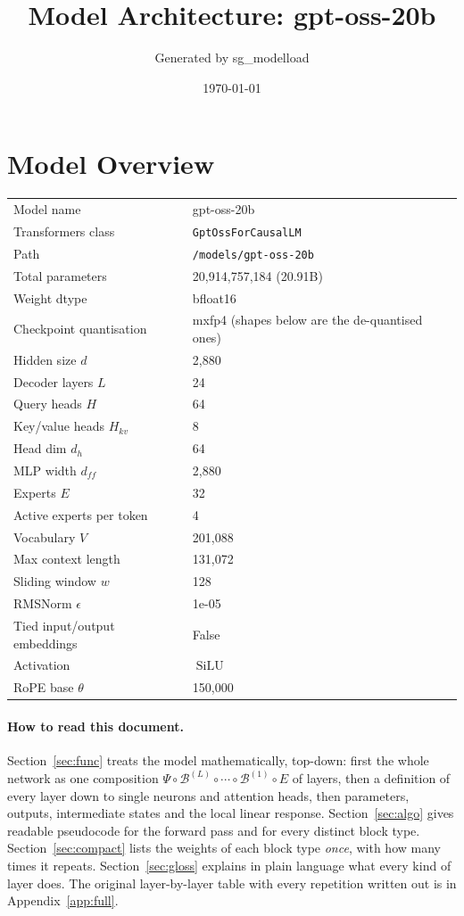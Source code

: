 \documentclass[10pt,a4paper]{article}
\title{Model Architecture: gpt-oss-20b}
\author{Generated by sg\_modelload}
\date{\today}
\newcommand{\op}[1]{\operatorname{#1}}
\theoremstyle{definition}
\begin{document}
\maketitle
\tableofcontents
\clearpage
\section{Model Overview}
\begin{tabular}{ll}
\toprule
Model name & gpt-oss-20b \\
Transformers class & \texttt{GptOssForCausalLM} \\
Path & \texttt{/models/gpt-oss-20b} \\
Total parameters & 20,914,757,184 (20.91B) \\
Weight dtype & bfloat16 \\
Checkpoint quantisation & mxfp4 (shapes below are the de-quantised ones) \\
\midrule
Hidden size $d$ & 2,880 \\
Decoder layers $L$ & 24 \\
Query heads $H$ & 64 \\
Key/value heads $H_{kv}$ & 8 \\
Head dim $d_h$ & 64 \\
MLP width $d_{ff}$ & 2,880 \\
Experts $E$ & 32 \\
Active experts per token & 4 \\
Vocabulary $V$ & 201,088 \\
Max context length & 131,072 \\
Sliding window $w$ & 128 \\
RMSNorm $\epsilon$ & 1e-05 \\
Tied input/output embeddings & False \\
Activation & $\op{SiLU}$ \\
RoPE base $\theta$ & 150,000 \\
\bottomrule
\end{tabular}

\paragraph{How to read this document.} Section~\ref{sec:func} treats the model mathematically, top-down: first the whole network as one composition $\Psi\circ\mathcal{B}^{(L)}\circ\cdots\circ\mathcal{B}^{(1)}\circ E$ of layers, then a definition of every layer down to single neurons and attention heads, then parameters, outputs, intermediate states and the local linear response. Section~\ref{sec:algo} gives readable pseudocode for the forward pass and for every distinct block type. Section~\ref{sec:compact} lists the weights of each block type \emph{once}, with how many times it repeats. Section~\ref{sec:gloss} explains in plain language what every kind of layer does. The original layer-by-layer table with every repetition written out is in Appendix~\ref{app:full}.
\end{document}
